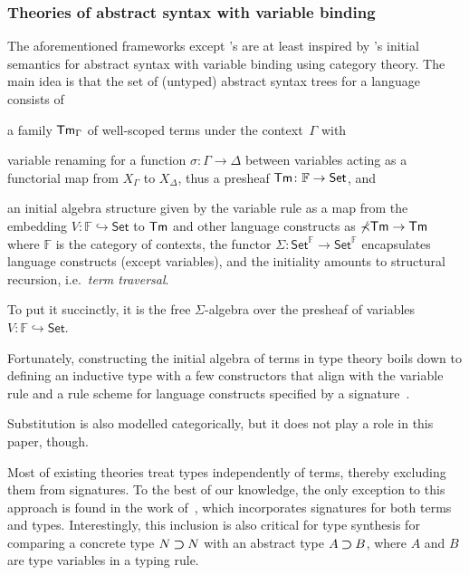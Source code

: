\subsubsection{Theories of abstract syntax with variable binding}\label{sec:theory-of-syntax}
The aforementioned frameworks except \citeauthor{Gheri2020}'s are at least inspired by \citet{Fiore1999}'s initial semantics for abstract syntax with variable binding using category theory.
The main idea is that the set of (untyped) abstract syntax trees for a language consists of
\begin{enumerate*}
  \item a family $\mathsf{Tm}_{\Gamma}$ of well-scoped terms under the context~$\Gamma$ with
  \item variable renaming for a function $\sigma\colon \Gamma \to \Delta$ between variables acting as a functorial map from $X_{\Gamma}$ to $X_{\Delta}$, thus a presheaf $\mathsf{Tm}\colon \mathbb{F} \to \mathsf{Set}$, and
  \item an initial algebra structure given by the variable rule as a map from the embedding $V\colon \mathbb{F} \hookrightarrow \mathsf{Set}$ to $\mathsf{Tm}$ and other language constructs as $\mathbb{\Sigma}\mathsf{Tm} \to \mathsf{Tm}$ where $\mathbb{F}$ is the category of contexts, the functor $\mathbb{\Sigma}\colon \mathsf{Set}^\mathbb{F} \to \mathsf{Set}^\mathbb{F}$ encapsulates language constructs (except variables), and the initiality amounts to structural recursion, i.e.\ \emph{term traversal}.
\end{enumerate*}
To put it succinctly, it is the free $\mathbb{\Sigma}$-algebra over the presheaf of variables $V\colon \mathbb{F} \hookrightarrow \mathsf{Set}$.

Fortunately, constructing the initial algebra of terms in type theory boils down to defining an inductive type with a few constructors that align with the variable rule and a rule scheme for language constructs specified by a signature~\citep{Allais2021,Fiore2022}.

Substitution is also modelled categorically, but it does not play a role in this paper, though.

\begin{remark} \label{re:type-signature}
Most of existing theories treat types independently of terms, thereby excluding them from signatures.
To the best of our knowledge, the only exception to this approach is found in the work of~\citet{Arkor2020}, which incorporates signatures for both terms and types.
Interestingly, this inclusion is also critical for type synthesis for comparing a concrete type $N \mathbin{\bm{\supset}} N$ with an abstract type $A \mathbin{\bm{\supset}} B$, where $A$ and $B$ are type variables in a typing rule.
\end{remark}

